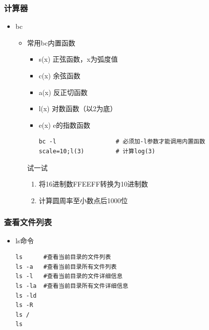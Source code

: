 \documentclass[xcolor=svgnames,bigger,presentation]{beamer}
\begin{document}
\begin{frame}[fragile]
\frametitle{计算器}
\label{sec-4-2-9}
\begin{itemize}

\item bc
\label{sec-4-2-9-1}%
\begin{itemize}

\item 常用bc内置函数
\label{sec-4-2-9-1-1}%
\begin{itemize}

\item s(x) 正弦函数，x为弧度值
\label{sec-4-2-9-1-1-1}%

\item c(x) 余弦函数
\label{sec-4-2-9-1-1-2}%

\item a(x) 反正切函数
\label{sec-4-2-9-1-1-3}%

\item l(x) 对数函数（以2为底）
\label{sec-4-2-9-1-1-4}%

\item e(x) e的指数函数\\
\label{sec-4-2-9-1-1-5}%
\begin{verbatim}
bc -l                 # 必须加-l参数才能调用内置函数
scale=10;l(3)         # 计算log(3)
\end{verbatim}
\end{itemize} %
\begin{block}{试一试}
\label{sec-4-2-9-1-1-6}

\begin{enumerate}
\item 将16进制数FFEEFF转换为10进制数
\item 计算圆周率至小数点后1000位
\end{enumerate}
\end{block}
\end{itemize} %
\end{itemize} %
\end{frame}
\begin{frame}[fragile]
\frametitle{查看文件列表}
\label{sec-4-2-10}
\begin{itemize}

\item ls命令\\
\label{sec-4-2-10-1}%
\begin{verbatim}
ls      #查看当前目录的文件列表
ls -a   #查看当前目录所有文件列表
ls -l   #查看当前目录的文件详细信息
ls -la  #查看当前目录所有文件详细信息
ls -ld
ls -R
ls /
ls
\end{verbatim}
\end{itemize} %
\end{frame}
\end{document}
